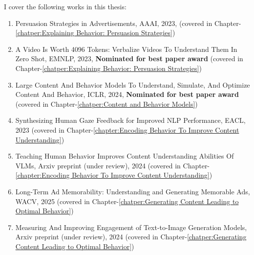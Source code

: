 \documentclass[PhD]{iiitd}
\begin{document}
I cover the following works in this thesis:
\begin{enumerate}
    \item Persuasion Strategies in Advertisements, AAAI, 2023, (covered in Chapter-\ref{chatper:Explaining Behavior: Persuasion Strategies})
    \item A Video Is Worth 4096 Tokens: Verbalize Videos To Understand Them In Zero Shot, EMNLP, 2023, \textbf{Nominated for best paper award} (covered in Chapter-\ref{chatper:Explaining Behavior: Persuasion Strategies})
    \item Large Content And Behavior Models To Understand, Simulate, And Optimize Content And Behavior, ICLR, 2024, \textbf{Nominated for best paper award} (covered in Chapter-\ref{chatper:Content and Behavior Models})
    \item Synthesizing Human Gaze Feedback for Improved NLP Performance, EACL, 2023 (covered in Chapter-\ref{chapter:Encoding Behavior To Improve Content Understanding})
    \item Teaching Human Behavior Improves Content Understanding Abilities Of VLMs, Arxiv preprint (under review), 2024 (covered in Chapter-\ref{chapter:Encoding Behavior To Improve Content Understanding})
    \item Long-Term Ad Memorability: Understanding and Generating Memorable Ads, WACV, 2025 (covered in Chapter-\ref{chatper:Generating Content Leading to Optimal Behavior})
    \item Measuring And Improving Engagement of Text-to-Image Generation Models, Arxiv preprint (under review), 2024 (covered in Chapter-\ref{chatper:Generating Content Leading to Optimal Behavior})
\end{enumerate}
\end{document}
